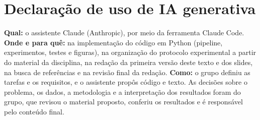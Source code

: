 \documentclass[conference]{IEEEtran}
\begin{document}
\section*{Declaração de uso de IA generativa}
\textbf{Qual:} o assistente Claude (Anthropic), por meio da ferramenta Claude Code. \textbf{Onde e para quê:} na implementação do código em Python (pipeline, experimentos, testes e figuras), na organização do protocolo experimental a partir do material da disciplina, na redação da primeira versão deste texto e dos slides, na busca de referências e na revisão final da redação. \textbf{Como:} o grupo definiu as tarefas e os requisitos, e o assistente propôs código e texto. As decisões sobre o problema, os dados, a metodologia e a interpretação dos resultados foram do grupo, que revisou o material proposto, conferiu os resultados e é responsável pelo conteúdo final.



\end{document}
